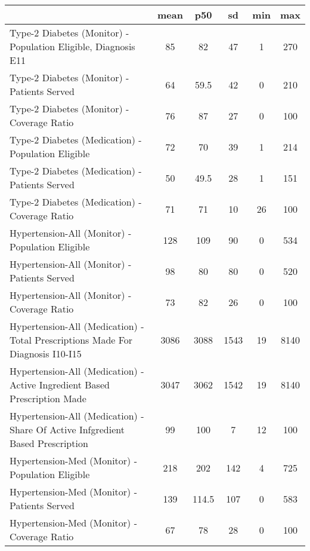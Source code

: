 {
\def\sym#1{\ifmmode^{#1}\else\(^{#1}\)\fi}
\begin{tabular}{l*{1}{ccccc}}
\hline\hline
                    &        mean&         p50&          sd&         min&         max\\
\hline
Type-2 Diabetes (Monitor) - Population Eligible, Diagnosis E11&          85&          82&          47&           1&         270\\
Type-2 Diabetes (Monitor) - Patients Served&          64&        59.5&          42&           0&         210\\
Type-2 Diabetes (Monitor) - Coverage Ratio&          76&          87&          27&           0&         100\\
Type-2 Diabetes (Medication) - Population Eligible&          72&          70&          39&           1&         214\\
Type-2 Diabetes (Medication) - Patients Served&          50&        49.5&          28&           1&         151\\
Type-2 Diabetes (Medication) - Coverage Ratio&          71&          71&          10&          26&         100\\
Hypertension-All (Monitor) - Population Eligible&         128&         109&          90&           0&         534\\
Hypertension-All (Monitor) - Patients Served&          98&          80&          80&           0&         520\\
Hypertension-All (Monitor) - Coverage Ratio&          73&          82&          26&           0&         100\\
Hypertension-All (Medication) - Total Prescriptions Made For Diagnosis I10-I15&        3086&        3088&        1543&          19&        8140\\
Hypertension-All (Medication) - Active Ingredient Based Prescription Made&        3047&        3062&        1542&          19&        8140\\
Hypertension-All (Medication) - Share Of Active Infgredient Based Prescription&          99&         100&           7&          12&         100\\
Hypertension-Med (Monitor) - Population Eligible&         218&         202&         142&           4&         725\\
Hypertension-Med (Monitor) - Patients Served&         139&       114.5&         107&           0&         583\\
Hypertension-Med (Monitor) - Coverage Ratio&          67&          78&          28&           0&         100\\

\end{tabular}}
